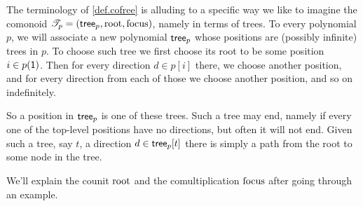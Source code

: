 \documentclass[DynamicalBook]{subfiles}
\begin{document}
The terminology of \cref{def.cofree} is alluding to a specific way we like to imagine the comonoid $\mathscr{T}_{p}=(\mathsf{tree}_p,\mathrm{root},\mathrm{focus})$, namely in terms of trees. To every polynomial $p$, we will associate a new polynomial $\mathsf{tree}_p$ whose positions are (possibly infinite) trees in $p$. To choose such tree we first choose its root to be some position $i\in p(\textsf{1})$. Then for every direction $d\in p[i]$ there, we choose another position, and for every direction from each of those we choose another position, and so on indefinitely.

So a position in $\mathsf{tree}_p$ is one of these trees. Such a tree may end, namely if every one of the top-level positions have no directions, but often it will not end. Given such a tree, say $t$, a direction $d\in\mathsf{tree}_p[t]$ there is simply a path from the root to some node in the tree. 

We'll explain the counit $\mathrm{root}$ and the comultiplication $\mathrm{focus}$ after going through an example.
\end{document}
